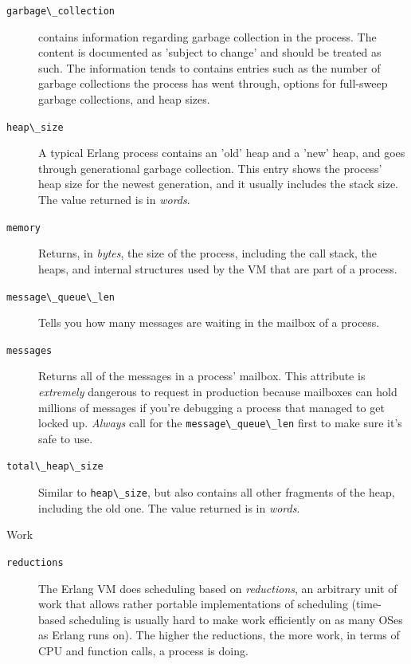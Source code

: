 \documentclass[11pt, oneside]{book}   	%
\newcommand{\expression}[1]{\Verb`#1`}
\begin{document}
\begin{description*}
\begin{description}
			\item[\expression{garbage\_collection}] contains information regarding garbage collection in the process. The content is documented as 'subject to change' and should be treated as such. The information tends to contains entries such as the number of garbage collections the process has went through, options for full-sweep garbage collections, and heap sizes.
			
			\item[\expression{heap\_size}] A typical Erlang process contains an 'old' heap and a 'new' heap, and goes through generational garbage collection. This entry shows the process' heap size for the newest generation, and it usually includes the stack size. The value returned is in \emph{words}.
			
			\item[\expression{memory}] Returns, in \emph{bytes}, the size of the process, including the call stack, the heaps, and internal structures used by the VM that are part of a process.
			
			\item[\expression{message\_queue\_len}] Tells you how many messages are waiting in the mailbox of a process.
			
			\item[\expression{messages}] Returns all of the messages in a process' mailbox. This attribute is \emph{extremely} dangerous to request in production because mailboxes can hold millions of messages if you're debugging a process that managed to get locked up. \emph{Always} call for the \expression{message\_queue\_len} first to make sure it's safe to use.
			
			\item[\expression{total\_heap\_size}] Similar to \expression{heap\_size}, but also contains all other fragments of the heap, including the old one. The value returned is in \emph{words}.
			
			\end{description}
	\item[Work] \hfill
		\begin{description}
			\item[\expression{reductions}] The Erlang VM does scheduling based on \emph{reductions}, an arbitrary unit of work that allows rather portable implementations of scheduling (time-based scheduling is usually hard to make work efficiently on as many OSes as Erlang runs on). The higher the reductions, the more work, in terms of CPU and function calls, a process is doing. 
		\end{description}
\end{description*}
\end{document}

